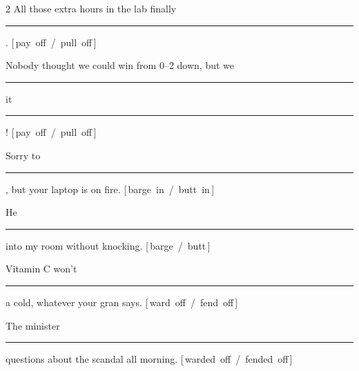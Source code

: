 \documentclass[11pt,a4paper]{article}
\newcommand{\uifont}{\sffamily}
\newcommand{\opt}[2]{\mbox{{\color{mute}[}\,{\uifont\small #1}~{\color{mute}/}~{\uifont\small #2}\,{\color{mute}]}}}
\newcommand{\num}[1]{\leavevmode{\uifont\bfseries\small\color{accent}#1}}
\newcommand{\blank}[1][1.25cm]{\textcolor{mute}{\rule[-0.45ex]{#1}{0.5pt}}}
\begin{document}
{\small\begin{multicols}{2}\RaggedRight
\num{a} All those extra hours in the lab finally \blank[1.8cm]. \opt{pay off}{pull off}\par\vspace{1.3mm}
\num{b} Nobody thought we could win from 0--2 down, but we \blank[1.4cm] it \blank[0.9cm]! \opt{pay off}{pull off}\par\vspace{1.3mm}
\num{c} Sorry to \blank[1.6cm], but your laptop is on fire. \opt{barge in}{butt in}\par\vspace{1.3mm}
\num{d} He \blank[1.6cm] into my room without knocking. \opt{barge}{butt}\par\vspace{1.3mm}
\num{e} Vitamin C won’t \blank[1.6cm] a cold, whatever your gran says. \opt{ward off}{fend off}\par\vspace{1.3mm}
\num{f} The minister \blank[1.6cm] questions about the scandal all morning. \opt{warded off}{fended off}\par
\end{multicols}}
\end{document}
